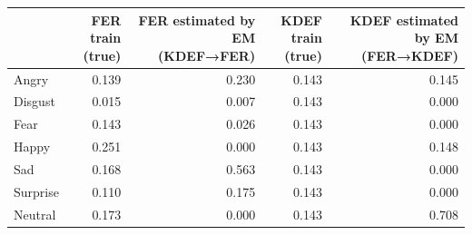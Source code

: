 \begin{tabular}{lrrrr}
\toprule
 & FER train (true) & FER estimated by EM (KDEF→FER) & KDEF train (true) & KDEF estimated by EM (FER→KDEF) \\
\midrule
Angry & 0.139 & 0.230 & 0.143 & 0.145 \\
Disgust & 0.015 & 0.007 & 0.143 & 0.000 \\
Fear & 0.143 & 0.026 & 0.143 & 0.000 \\
Happy & 0.251 & 0.000 & 0.143 & 0.148 \\
Sad & 0.168 & 0.563 & 0.143 & 0.000 \\
Surprise & 0.110 & 0.175 & 0.143 & 0.000 \\
Neutral & 0.173 & 0.000 & 0.143 & 0.708 \\
\bottomrule
\end{tabular}
